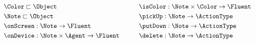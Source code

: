 \begin{equation*}
    \begin{aligned}\
        & \Color \sqsubset \Object \\
        & \Note \sqsubset \Object \\
        & \onScreen: \Note \rightarrow \Fluent \\
        & \onDevice: \Note \times \Agent \rightarrow \Fluent \\
    \end{aligned}
    \hspace{30pt}
    \begin{aligned}
        & \isColor: \Note \times \Color \rightarrow \Fluent \\
        & \pickUp: \Note \rightarrow \ActionType \\
        & \putDown: \Note \rightarrow \ActionType \\
        & \delete: \Note \rightarrow \ActionType \\ 
    \end{aligned}
\end{equation*}